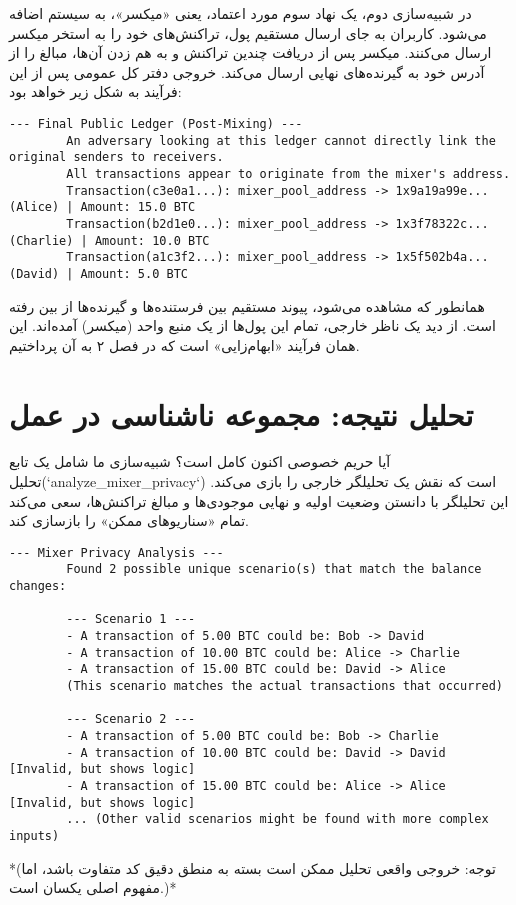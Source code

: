 در شبیه‌سازی دوم، یک نهاد سوم مورد اعتماد، یعنی «میکسر»، به سیستم اضافه می‌شود. کاربران به جای ارسال مستقیم پول، تراکنش‌های خود را به استخر میکسر ارسال می‌کنند. میکسر پس از دریافت چندین تراکنش و به هم زدن آن‌ها، مبالغ را از آدرس خود به گیرنده‌های نهایی ارسال می‌کند. خروجی دفتر کل عمومی پس از این فرآیند به شکل زیر خواهد بود:

\begin{latin}
	\begin{lstlisting}[caption={خروجی دفتر کل پس از استفاده از میکسر}, label=list:mixer_output]
		--- Final Public Ledger (Post-Mixing) ---
		An adversary looking at this ledger cannot directly link the original senders to receivers.
		All transactions appear to originate from the mixer's address.
		Transaction(c3e0a1...): mixer_pool_address -> 1x9a19a99e... (Alice) | Amount: 15.0 BTC
		Transaction(b2d1e0...): mixer_pool_address -> 1x3f78322c... (Charlie) | Amount: 10.0 BTC
		Transaction(a1c3f2...): mixer_pool_address -> 1x5f502b4a... (David) | Amount: 5.0 BTC
	\end{lstlisting}
\end{latin}

همانطور که مشاهده می‌شود، پیوند مستقیم بین فرستنده‌ها و گیرنده‌ها از بین رفته است. از دید یک ناظر خارجی، تمام این پول‌ها از یک منبع واحد (میکسر) آمده‌اند. این همان فرآیند «ابهام‌زایی» است که در فصل ۲ به آن پرداختیم.

\section{تحلیل نتیجه: مجموعه ناشناسی در عمل}

آیا حریم خصوصی اکنون کامل است؟ شبیه‌سازی ما شامل یک تابع تحلیل\linebreak (`analyze\_mixer\_privacy`) است که نقش یک تحلیلگر خارجی را بازی می‌کند. این تحلیلگر با دانستن وضعیت اولیه و نهایی موجودی‌ها و مبالغ تراکنش‌ها، سعی می‌کند تمام «سناریوهای ممکن» را بازسازی کند.

\begin{latin}
	\begin{lstlisting}[caption={خروجی تحلیل حریم خصوصی میکسر}, label=list:analysis_output]
		--- Mixer Privacy Analysis ---
		Found 2 possible unique scenario(s) that match the balance changes:
		
		--- Scenario 1 ---
		- A transaction of 5.00 BTC could be: Bob -> David
		- A transaction of 10.00 BTC could be: Alice -> Charlie
		- A transaction of 15.00 BTC could be: David -> Alice
		(This scenario matches the actual transactions that occurred)
		
		--- Scenario 2 ---
		- A transaction of 5.00 BTC could be: Bob -> Charlie
		- A transaction of 10.00 BTC could be: David -> David [Invalid, but shows logic]
		- A transaction of 15.00 BTC could be: Alice -> Alice [Invalid, but shows logic]
		... (Other valid scenarios might be found with more complex inputs)
	\end{lstlisting}
\end{latin}
*(توجه: خروجی واقعی تحلیل ممکن است بسته به منطق دقیق کد متفاوت باشد، اما مفهوم اصلی یکسان است.)*

